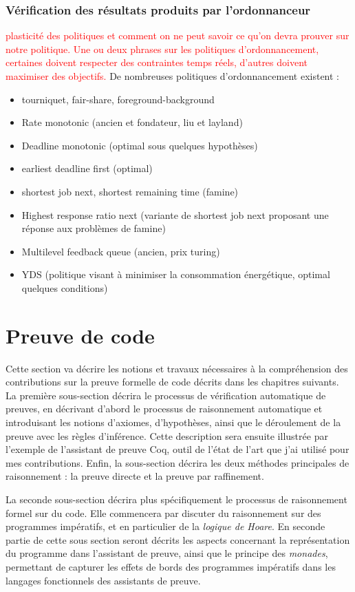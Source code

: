 		\subsubsection{Vérification des résultats produits par l'ordonnanceur}
		\textcolor{red}{plasticité des politiques et comment on ne peut savoir ce qu'on devra prouver sur notre politique. Une ou deux phrases sur les politiques d'ordonnancement, certaines doivent respecter des contraintes temps réels, d'autres doivent maximiser des objectifs.}
		De nombreuses politiques d'ordonnancement existent :
		\begin{itemize}
			\item{tourniquet, fair-share, foreground-background }
			\item{Rate monotonic (ancien et fondateur, liu et layland)}
			\item{Deadline monotonic (optimal sous quelques hypothèses)}
			\item{earliest deadline first (optimal)}
			\item{shortest job next, shortest remaining time (famine)}
			\item{Highest response ratio next (variante de shortest job next proposant une réponse aux problèmes de famine)}
			\item{Multilevel feedback queue (ancien, prix turing)}
			\item{YDS (politique visant à minimiser la consommation énergétique, optimal quelques conditions)}
		\end{itemize}

	\section{Preuve de code}

	Cette section va décrire les notions et travaux nécessaires à la compréhension des contributions sur la preuve formelle de code décrits dans les chapitres suivants. La première sous-section décrira le processus de vérification automatique de preuves, en décrivant d'abord le processus de raisonnement automatique et introduisant les notions d'axiomes, d'hypothèses, ainsi que le déroulement de la preuve avec les règles d'inférence. Cette description sera ensuite illustrée par l'exemple de l'assistant de preuve Coq, outil de l'état de l'art que j'ai utilisé pour mes contributions. Enfin, la sous-section décrira les deux méthodes principales de raisonnement : la preuve directe et la preuve par raffinement.

	La seconde sous-section décrira plus spécifiquement le processus de raisonnement formel sur du code. Elle commencera par discuter du raisonnement sur des programmes impératifs, et en particulier de la \emph{logique de Hoare}. En seconde partie de cette sous section seront décrits les aspects concernant la représentation du programme dans l'assistant de preuve, ainsi que le principe des \emph{monades}, permettant de capturer les effets de bords des programmes impératifs dans les langages fonctionnels des assistants de preuve.

